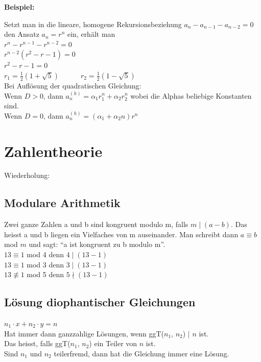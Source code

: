 \documentclass[12pt]{scrartcl}
\begin{document}
\textbf{Beispiel:}

Setzt man in die lineare, homogene Rekursionsbeziehung $a_n - a_{n-1} - a_{n-2} = 0$
den Ansatz $a_n = r^n$ ein, erhält man\\

$r^n - r^{n-1} - r^{n-2} = 0$\\
$r^{n-2} (r^2 - r - 1) = 0$\\
$r^2 - r - 1 = 0$\\

$\displaystyle{r_1 = \frac{1}{2} \left(1 + \sqrt{5}\right)} \quad\quad\quad r_2 = \frac{1}{2} \left(1 - \sqrt{5}\right)$\\


Bei Auflösung der quadratischen Gleichung: \\
Wenn $D > 0$, dann $a_n^{(h)} = \alpha_1 r_1^n + \alpha_2 r_2^n$
wobei die Alphas beliebige Konstanten sind.\\

Wenn $D = 0$, dann $a_n^{(h)} = (\alpha_1 + \alpha_2 n) r^n$

\newpage
\section{Zahlentheorie}
Wiederholung:
\subsection{Modulare Arithmetik}
Zwei ganze Zahlen a und b sind kongruent modulo m, falls $m\mid (a - b)$.
Das heisst a und b liegen ein Vielfaches von m auseinander. Man schreibt dann $a \equiv b$ mod $m$ und sagt:
``a ist kongruent zu b modulo m''.\\

$13 \equiv 1$ mod 4 denn $4 \mid (13 - 1)$\\
$13 \equiv 1$ mod 3 denn $3 \mid (13 - 1)$\\
$13 \not\equiv  1$ mod 5 denn $5 \nmid (13 - 1)$\\

\subsection{Lösung diophantischer Gleichungen}
$n_1 \cdot x + n_2 \cdot y = n$\\
Hat immer dann ganzzahlige Lösungen, wenn ggT($n_1$, $n_2$) $\vert$ $n$ ist. \\Das heisst, 
falls ggT($n_1$, $n_2$) ein Teiler von $n$ ist.\\
Sind $n_1$ und $n_2$ teilerfremd, dann hat die Gleichung immer eine Lösung.\\
\end{document}
